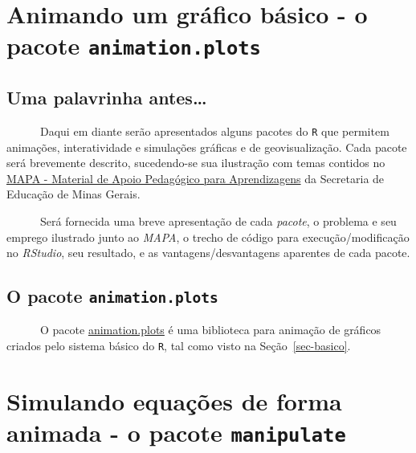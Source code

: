 \documentclass[
  letterpaper,
  DIV=11,
  numbers=noendperiod]{scrreprt}
\begin{document}

\chapter{\texorpdfstring{Animando um gráfico básico - o pacote
\texttt{animation.plots}}{Animando um gráfico básico - o pacote animation.plots}}\label{animando-um-gruxe1fico-buxe1sico---o-pacote-animation.plots}

\section{Uma palavrinha antes\ldots{}}\label{uma-palavrinha-antes}

~~~~~~Daqui em diante serão apresentados alguns pacotes do \texttt{R}
que permitem animações, interatividade e simulações gráficas e de
geovisualização. Cada pacote será brevemente descrito, sucedendo-se sua
ilustração com temas contidos no
\href{https://seliga.educacao.mg.gov.br/cardenos-mapa}{MAPA - Material
de Apoio Pedagógico para Aprendizagens} da Secretaria de Educação de
Minas Gerais.

~~~~~~Será fornecida uma breve apresentação de cada \emph{pacote}, o
problema e seu emprego ilustrado junto ao \emph{MAPA}, o trecho de
código para execução/modificação no \emph{RStudio}, seu resultado, e as
vantagens/desvantagens aparentes de cada pacote.

\section{\texorpdfstring{O pacote
\texttt{animation.plots}}{O pacote animation.plots}}\label{o-pacote-animation.plots}

~~~~~~O pacote
\href{https://cran.r-project.org/web/packages/anim.plots/index.html}{animation.plots}
é uma biblioteca para animação de gráficos criados pelo sistema básico
do \texttt{R}, tal como visto na Seção~\ref{sec-basico}.


\chapter{\texorpdfstring{Simulando equações de forma animada - o pacote
\texttt{manipulate}}{Simulando equações de forma animada - o pacote manipulate}}\label{simulando-equauxe7uxf5es-de-forma-animada---o-pacote-manipulate}

\end{document}
